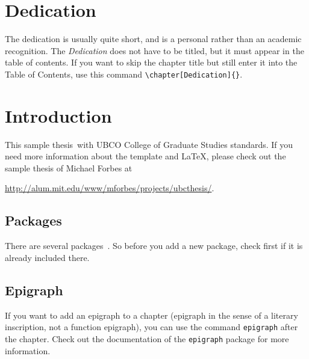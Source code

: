 \documentclass[msc,oneside]{ubcthesis}%
\begin{document}
\chapter{Dedication} %
The dedication is usually quite short, and is a personal rather than
an academic recognition.  The \emph{Dedication} does not have to be
titled, but it must appear in the table of contents.  If you want to
skip the chapter title but still enter it into the Table of Contents,
use this command \verb|\chapter[Dedication]{}|.




\mainmatter


\chapter{Introduction}
This sample thesis\  with UBCO College of Graduate Studies standards. If you need more information about the template and LaTeX, please check out the sample thesis of Michael Forbes at

\href{http://alum.mit.edu/www/mforbes/projects/ubcthesis/}{http://alum.mit.edu/www/mforbes/projects/ubcthesis/}.

\cite{MR2848848,MR2461448,MR2834159,infconv,convmono,MR2668638,Bauschke:2007-PA02,proxbas}

\section{Packages}
There are several packages\ . So before you add a new package, check first if it is already included there.


\section{Epigraph}
If you want to add an epigraph to a chapter (epigraph in the sense of a literary inscription, not a function epigraph), you can use the command \texttt{epigraph} after the chapter. Check out the documentation of the \texttt{epigraph} package for more information.
\end{document}
